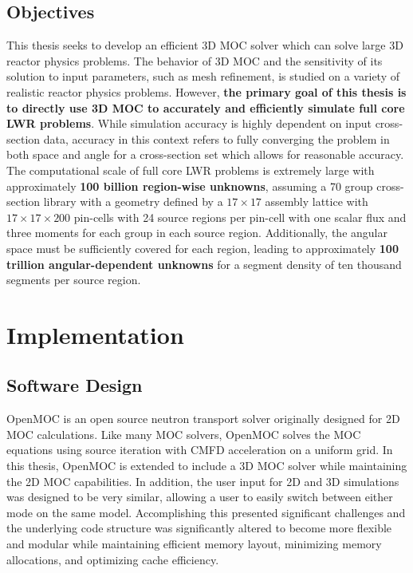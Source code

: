 \documentclass[12pt,twoside]{mitthesis-exec}
\begin{document}
\subsection*{Objectives}

This thesis seeks to develop an efficient 3D MOC solver which can solve large 3D reactor physics problems. The behavior of 3D MOC and the sensitivity of its solution to input parameters, such as mesh refinement, is studied on a variety of realistic reactor physics problems. However, \textbf{the primary goal of this thesis is to directly use 3D MOC to accurately and efficiently simulate full core LWR problems}. While simulation accuracy is highly dependent on input cross-section data, accuracy in this context refers to fully converging the problem in both space and angle for a cross-section set which allows for reasonable accuracy. The computational scale of full core LWR problems is extremely large with approximately \textbf{100 billion region-wise unknowns}, assuming a 70 group cross-section library with a geometry defined by a $17 \times 17$ assembly lattice with $17 \times 17 \times 200$ pin-cells with 24 source regions per pin-cell with one scalar flux and three moments for each group in each source region. Additionally, the angular space must be sufficiently covered for each region, leading to approximately \textbf{100 trillion angular-dependent unknowns} for a segment density of ten thousand segments per source region.


\section*{Implementation}

\subsection*{Software Design}

OpenMOC is an open source neutron transport solver originally designed for 2D MOC calculations. Like many MOC solvers, OpenMOC solves the MOC equations using source iteration with CMFD acceleration on a uniform grid. In this thesis, OpenMOC is extended to include a 3D MOC solver while maintaining the 2D MOC capabilities. In addition, the user input for 2D and 3D simulations was designed to be very similar, allowing a user to easily switch between either mode on the same model. Accomplishing this presented significant challenges and the underlying code structure was significantly altered to become more flexible and modular while maintaining efficient memory layout, minimizing memory allocations, and optimizing cache efficiency. 
\end{document}

